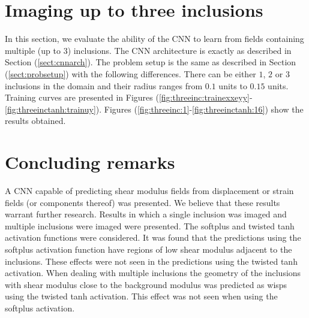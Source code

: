 \documentclass[12pt]{article}
\begin{document}
\section{\label{sect:threeinc}Imaging up to three inclusions}
In this section, we evaluate the ability of the CNN to learn from fields containing multiple (up to $3$) inclusions. The CNN architecture is exactly as described in Section (\ref{sect:cnnarch}). The problem setup is the same as described in Section (\ref{sect:probsetup}) with the following differences. There can be either $1$, $2$ or $3$ inclusions in the domain and their radius ranges from $0.1$ units to $0.15$ units. Training curves are presented in Figures (\ref{fig:threeinc:trainexxeyy}-\ref{fig:threeinctanh:trainuy}). Figures (\ref{fig:threeinc:1}-\ref{fig:threeinctanh:16}) show the results obtained. 
\section{Concluding remarks}
A CNN capable of predicting shear modulus fields from displacement or strain fields (or components thereof) was presented. We believe that these results warrant further research. Results in which a single inclusion was imaged and multiple inclusions were imaged were presented. The softplus and twisted tanh activation functions were considered. It was found that the predictions using the softplus activation function have regions of low shear modulus adjacent to the inclusions. These effects were not seen in the predictions using the twisted tanh activation. When dealing with multiple inclusions the geometry of the inclusions with shear modulus close to the background modulus was predicted as wisps using the twisted tanh activation. This effect was not seen when using the softplus activation.    
\end{document}
